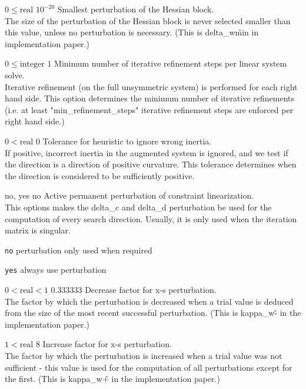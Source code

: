 %
{$0\leq\textrm{real}$}%
{$10^{-20}$}%
{Smallest perturbation of the Hessian block.\\
The size of the perturbation of the Hessian block is never selected smaller than this value, unless no perturbation is necessary. (This is delta\_w\^min in implementation paper.)}%
{}

%
{$0\leq\textrm{integer}$}%
{$1$}%
{Minimum number of iterative refinement steps per linear system solve.\\
Iterative refinement (on the full unsymmetric system) is performed for each right hand side.  This option determines the minimum number of iterative refinements (i.e. at least "min\_refinement\_steps" iterative refinement steps are enforced per right hand side.)}%
{}

%
{$0<\textrm{real}$}%
{$0$}%
{Tolerance for heuristic to ignore wrong inertia.\\
If positive, incorrect inertia in the augmented system is ignored, and we test if the direction is a direction of positive curvature.  This tolerance determines when the direction is considered to be sufficiently positive.}%
{}

%
{\ttfamily no, yes}%
{no}%
{Active permanent perturbation of constraint linearization.\\
This options makes the delta\_c and delta\_d perturbation be used for the computation of every search direction.  Usually, it is only used when the iteration matrix is singular.}%
{\begin{list}{}{
\setlength{\parsep}{0em}
\setlength{\leftmargin}{5ex}
\setlength{\labelwidth}{2ex}
\setlength{\itemindent}{0ex}
\setlength{\topsep}{0pt}}
\item[\texttt{no}] perturbation only used when required
\item[\texttt{yes}] always use perturbation
\end{list}
}

%
{$0<\textrm{real}<1$}%
{$0.333333$}%
{Decrease factor for x-s perturbation.\\
The factor by which the perturbation is decreased when a trial value is deduced from the size of the most recent successful perturbation. (This is kappa\_w\^- in the implementation paper.)}%
{}

%
{$1<\textrm{real}$}%
{$8$}%
{Increase factor for x-s perturbation.\\
The factor by which the perturbation is increased when a trial value was not sufficient - this value is used for the computation of all perturbations except for the first. (This is kappa\_w\^+ in the implementation paper.)}%
{}

